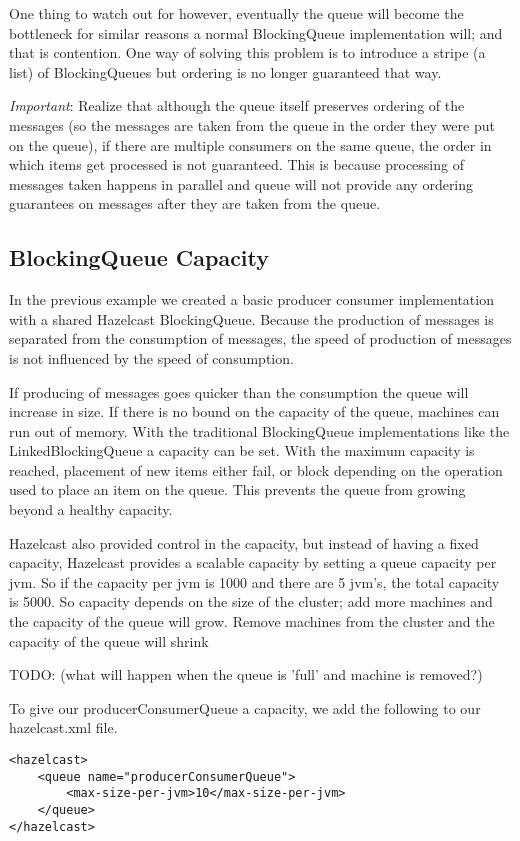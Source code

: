 One thing to watch out for however, eventually the queue will become the bottleneck for similar reasons a normal 
BlockingQueue implementation will; and that is contention. One way of solving this problem is to introduce 
a stripe (a list) of BlockingQueues but ordering is no longer guaranteed that way.

\emph{Important}: Realize that although the queue itself preserves ordering of the messages (so the messages
are taken from the queue in the order they were put on the queue), if there are multiple consumers 
on the same queue, the order in which items get processed is not guaranteed. This is because processing
of messages taken happens in parallel and queue will not provide any ordering guarantees on messages
after they are taken from the queue.

\subsection{BlockingQueue Capacity}

In the previous example we created a basic producer consumer implementation with a shared
Hazelcast BlockingQueue. Because the production of messages is separated from the consumption
of messages, the speed of production of messages is not influenced by the speed of consumption.

If producing of messages goes quicker than the consumption the queue will increase in size. If 
there is no bound on the capacity of the queue, machines can run out of memory. With the traditional 
BlockingQueue implementations like the LinkedBlockingQueue a capacity can be set. With the maximum 
capacity is reached, placement of new items either fail, or block depending on the operation used
to place an item on the queue. This prevents the queue from growing beyond a healthy capacity.

Hazelcast also provided control in the capacity, but instead of having a fixed capacity, Hazelcast
provides a scalable capacity by setting a queue capacity per jvm. So if the capacity per jvm is 1000
and there are 5 jvm's, the total capacity is 5000. So capacity depends on the size of the cluster; 
add more machines and the capacity of the queue will grow. Remove machines from the cluster and 
the capacity of the queue will shrink 

TODO: (what will happen when the queue is 'full' and machine is removed?) 

To give our producerConsumerQueue a capacity, we add the following to our hazelcast.xml file.
\begin{verbatim}
<hazelcast>
    <queue name="producerConsumerQueue">
        <max-size-per-jvm>10</max-size-per-jvm>
    </queue>
</hazelcast>
\end{verbatim}

